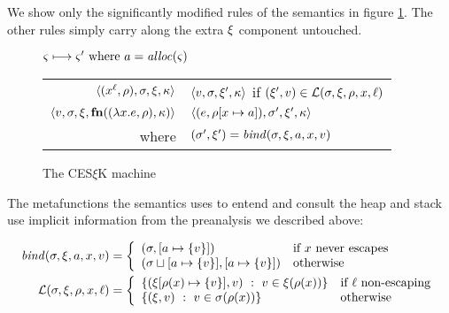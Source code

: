 \documentclass{llncs}
\begin{document}
We show only the significantly modified rules of the semantics in
figure \ref{fig:frame-semantics}. The other rules simply carry along
the extra $\mframe$ component untouched.
\begin{figure}
  \centering
  $\mstate \stepto \mstate' \text{ where } \maddr = \alloc(\mstate)$ \\
  \begin{tabular}{r|l}
    \hline
    $\tpl{(\svar[\mlab]{\mvar}, \menv), \mstore, \mframe, \mkont}$
    &
    $\tpl{\mval,\mstore,\mframe',\mkont}$ if $(\mframe', \mval) \in \lookup(\mstore,\mframe,\menv,\mvar,\mlab)$
    \\
    $\tpl{\mval,\mstore,\mframe,\kfn{\vclo{\slam{\mvar}{\mexpr}}{\menv}, \mkont}}$
    &
    $\tpl{(\mexpr, \extm{\menv}{\mvar}{\maddr}), \mstore', \mframe', \mkont}$
    \\ where & $(\mstore',\mframe') = \bind(\mstore,\mframe,\maddr,\mvar,\mval)$
  \end{tabular}
  \caption{The CES$\xi$K machine}
  \label{fig:frame-semantics}
\end{figure}

The metafunctions the semantics uses to entend and consult the heap
and stack use implicit information from the preanalysis we described
above:

\begin{align*}
  \bind(\mstore,\mframe,\maddr,\mvar,\mval) &=
   \left\{\begin{array}{ll}
            (\mstore, \snglm{\maddr}{\mval}) & \text{if } \mvar \text{ never escapes} \\
            (\joinone{\mstore}{\maddr}{\mval}, \snglm{\maddr}{\mval}) & \text{otherwise } \\
          \end{array}\right. \\
  \lookup(\mstore,\mframe,\menv,\mvar,\mlab) &=
    \left\{\begin{array}{ll}
          \setbuild{(\extm{\mframe}{\menv(\mvar)}{\set{\mval}}, \mval)}
                   {\mval \in \mframe(\menv(\mvar))}
                   & \text{if } \mlab \text{ non-escaping} \\
          \setbuild{(\mframe,\mval)}{\mval \in \mstore(\menv(\mvar))} & \text{otherwise}
           \end{array}\right.
\end{align*}
\end{document}
